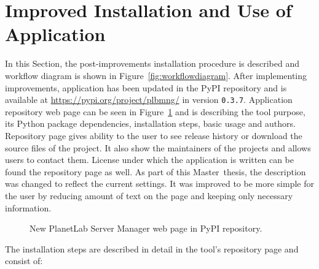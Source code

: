 {{{{{{{\section{Improved Installation and Use of Application}
\label{section:currentapp}
In this Section, the post-improvements installation procedure is described and workflow diagram is shown in Figure~\ref{fig:workflowdiagram}. After implementing improvements, application has been updated in the PyPI repository and is available at \url{https://pypi.org/project/plbmng/} in version \texttt{0.3.7}. Application repository web page can be seen in Figure~\ref{fig:plbmngrepo} and is describing the tool purpose, its Python package dependencies, installation steps, basic usage and authors. Repository page gives ability to the user to see release history or download the source files of the project. It also show the maintainers of the projects and allows users to contact them. License under which the application is written can be found the repository page as well. As part of this Master~thesis, the description was changed to reflect the current settings. It was improved to be more simple for the user by reducing amount of text on the page and keeping only necessary information.

\begin{figure}[H]
	\centering
	\caption{New PlanetLab Server Manager web page in PyPI repository.}
	\label{fig:plbmngrepo}
\end{figure}

The installation steps are described in detail in the tool's repository page and consist of:

}}}}}}}
